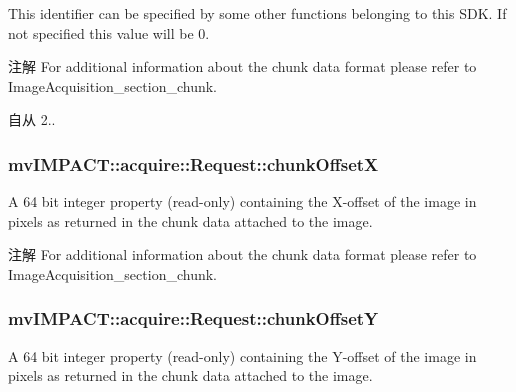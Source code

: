 This identifier can be specified by some other functions belonging to this S\+D\+K. If not specified this value will be 0.

\begin{DoxyNote}{注解}
For additional information about the chunk data format please refer to Image\+Acquisition\+\_\+section\+\_\+chunk.
\end{DoxyNote}
\begin{DoxySince}{自从}
2.. 
\end{DoxySince}
\hypertarget{classmv_i_m_p_a_c_t_1_1acquire_1_1_request_af0a8aaee59305ce3215db9bea6826958}{
\subsubsection[{chunk\+Offset\+X}]{ mv\+I\+M\+P\+A\+C\+T\+::acquire\+::\+Request\+::chunk\+Offset\+X}}\label{classmv_i_m_p_a_c_t_1_1acquire_1_1_request_af0a8aaee59305ce3215db9bea6826958}


A 64 bit integer property {\bfseries }(read-\/only) containing the X-\/offset of the image in pixels as returned in the chunk data attached to the image. 

\begin{DoxyNote}{注解}
For additional information about the chunk data format please refer to Image\+Acquisition\+\_\+section\+\_\+chunk. 
\end{DoxyNote}
\hypertarget{classmv_i_m_p_a_c_t_1_1acquire_1_1_request_aadd30b0a6de334e3819621b37e0e2c63}{
\subsubsection[{chunk\+Offset\+Y}]{ mv\+I\+M\+P\+A\+C\+T\+::acquire\+::\+Request\+::chunk\+Offset\+Y}}\label{classmv_i_m_p_a_c_t_1_1acquire_1_1_request_aadd30b0a6de334e3819621b37e0e2c63}


A 64 bit integer property {\bfseries }(read-\/only) containing the Y-\/offset of the image in pixels as returned in the chunk data attached to the image. 

